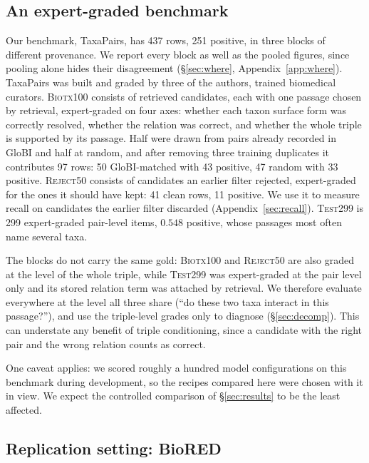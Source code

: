\documentclass[11pt]{article}
\newcommand{\bench}{\mbox{TaxaPairs}}
\begin{document}
\subsection{An expert-graded benchmark}
\label{sec:benchmark}

Our benchmark, \bench{}, has 437 rows, 251 positive, in three blocks of different provenance. We report every
block as well as the pooled figures, since pooling alone hides their disagreement (\S\ref{sec:where},
Appendix~\ref{app:where}). \bench{} was built and graded by three of the authors, trained biomedical
curators. \textsc{Biotx100} consists of retrieved candidates, each with one passage chosen
by retrieval, expert-graded on four axes: whether each taxon surface form was correctly resolved,
whether the relation was correct, and whether the whole triple is supported by its passage. Half
were drawn from pairs already recorded in GloBI and half at random, and after removing three
training duplicates it contributes 97 rows: 50 GloBI-matched with 43 positive, 47 random with 33
positive.  \textsc{Reject50} consists of candidates an earlier filter rejected, expert-graded for the ones it should have kept: 41 clean rows, 11
positive. We use it to measure recall on candidates the earlier filter discarded (Appendix~\ref{sec:recall}). \textsc{Test299} is
299 expert-graded pair-level items, $0.548$ positive, whose passages most often name several
taxa.

The blocks do not carry the same gold: \textsc{Biotx100} and \textsc{Reject50} are also graded at the level of the whole
triple, while \textsc{Test299} was expert-graded at the pair level only and its stored relation term was
attached by retrieval. We therefore evaluate everywhere at the level all three share (``do these two taxa interact in this passage?''), and use the triple-level grades only to diagnose
(\S\ref{sec:decomp}). This can understate any benefit of triple conditioning, since a candidate with the
right pair and the wrong relation counts as correct.

One caveat applies: we scored roughly a hundred model configurations on this benchmark during development, so the recipes compared here were chosen with it in view. We expect the controlled comparison of \S\ref{sec:results} to be the least affected.

\subsection{Replication setting: BioRED}
\label{sec:biored-setup}
\end{document}
